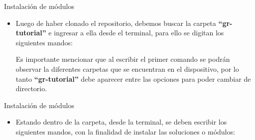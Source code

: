 \begin{frame}{Instalación de módulos}
\begin{itemize}
\item Luego de haber clonado el repositorio, debemos buscar la carpeta \textbf{“gr-tutorial”} e ingresar a ella desde el terminal, para ello se digitan los siguientes mandos:


Es importante mencionar que al escribir el primer comando se podrán observar la diferentes carpetas que se encuentran en el dispositivo, por lo tanto \textbf{“gr-tutorial”} debe aparecer entre las opciones para poder cambiar de directorio. 
\end{itemize}
\end{frame}


\begin{frame}{Instalación de módulos}
\begin{itemize}
\item Estando dentro de la carpeta, desde la terminal, se deben escribir los siguientes mandos, con la finalidad de instalar las soluciones o módulos:


\end{itemize}
\end{frame}

